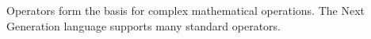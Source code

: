 Operators form the basis for complex mathematical operations. The Next Generation
language supports many standard operators.
